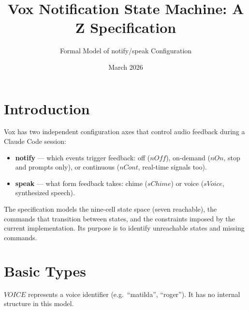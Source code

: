 \documentclass[a4paper,10pt,fleqn]{article}
\begin{document}
\title{Vox Notification State Machine: A Z Specification}
\author{Formal Model of notify/speak Configuration}
\date{March 2026}
\maketitle

\tableofcontents
\newpage

\section{Introduction}

Vox has two independent configuration axes that control audio
feedback during a Claude Code session:

\begin{itemize}
  \item \textbf{notify} --- which events trigger feedback:
    off ($nOff$), on-demand ($nOn$, stop and prompts only),
    or continuous ($nCont$, real-time signals too).
  \item \textbf{speak} --- what form feedback takes:
    chime ($sChime$) or voice ($sVoice$, synthesized speech).
\end{itemize}

The specification models the nine-cell state space (seven reachable), the commands
that transition between states, and the constraints imposed by
the current implementation. Its purpose is to identify
unreachable states and missing commands.

\section{Basic Types}

\begin{zed}
  [VOICE]
\end{zed}

$VOICE$ represents a voice identifier (e.g.\ ``matilda'', ``roger'').
It has no internal structure in this model.

\end{document}

